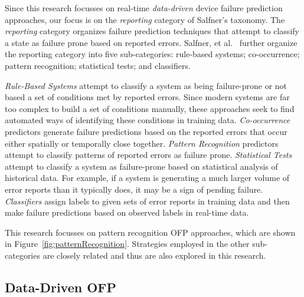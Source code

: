 
Since this research focusses on real-time \emph{data-driven} device failure
prediction approaches, our focus is on the \emph{reporting} category of
Salfner's taxonomy.  The \emph{reporting} category organizes failure prediction
techniques that attempt to classify a state as failure prone based on reported
errors.  Salfner, et al.~\cite{salfnerSurvey} further organize the reporting
category into five sub-categories: rule-based systems; co-occurrence; pattern
recognition; statistical tests; and classifiers.

\emph{Rule-Based Systems} attempt to classify a system as being failure-prone
or not based a set of conditions met by reported errors.  Since modern systems
are far too complex to build a set of conditions manually, these approaches
seek to find automated ways of identifying these conditions in training data.
\emph{Co-occurrence} predictors generate failure predictions based on the
reported errors that occur either spatially or temporally close together.
\emph{Pattern Recognition} predictors attempt to classify patterns of reported
errors as failure prone.  \emph{Statistical Tests} attempt to classify a system
as failure-prone based on statistical analysis of historical data.  For
example, if a system is generating a much larger volume of error reports than
it typically does, it may be a sign of pending failure.  \emph{Classifiers}
assign labels to given sets of error reports in training data and then make
failure predictions based on observed labels in real-time data.  

This research focusses on pattern recognition OFP approaches, which are shown
in Figure~\ref{fig:patternRecognition}.  Strategies employed in the other
sub-categories are closely related and thus are also explored in this research.

\figpatternRecognition{\textwidth}

\subsection{Data-Driven \ac{OFP}}


